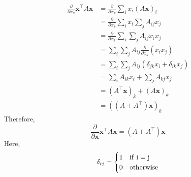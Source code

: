 $$\begin{aligned}
\frac{\partial }{\partial x_k}\bm{x}^\top A\bm{x}&=\frac{\partial }{\partial x_k}\sum_{i}x_i(A\bm{x})_i\\
&=\frac{\partial }{\partial x_k}\sum_{i}x_i\sum_{j}A_{ij}x_{j}\\
&=\frac{\partial }{\partial x_k}\sum_{i}\sum_{j}A_{ij}x_{i}x_{j}\\
&=\sum_{i}\sum_{j}A_{ij}\frac{\partial }{\partial x_k}(x_{i}x_{j})\\
&=\sum_{i}\sum_{j}A_{ij}(\delta_{jk}x_{i}+\delta_{ik}x_{j})\\
&=\sum_{i}A_{ik}x_{i}+\sum_{j}A_{kj}x_{j}\\
&=(A^\top\bm{x})_{k}+(A\bm{x})_{k}\\
&=\left((A+A^\top)\bm{x}\right)_{k}
\end{aligned}$$
Therefore, 
$$\frac{\partial }{\partial \bm{x}}\bm{x}^\top A\bm{x}=(A+A^\top)\bm{x}$$
Here, 
$$\delta_{ij}=\begin{cases}
1 & \rm{if}\ i=j\\
0 & \rm{otherwise}\\
\end{cases}$$